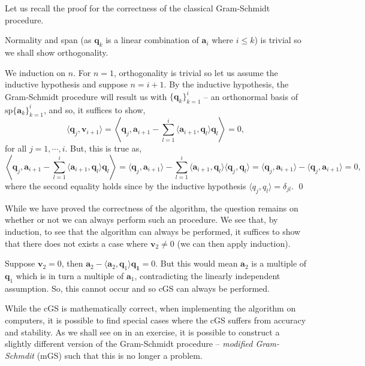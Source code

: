 \documentclass[
]{article}
\theoremstyle{definition}
\theoremstyle{definition}
\begin{document}
Let us recall the proof for the correctness of the classical
Gram-Schmidt procedure.

\proof

Normality and span (as \(\mathbf{q}_k\) is a linear combination of
\(\mathbf{a}_i\) where \(i \le k\)) is trivial so we shall show
orthogonality.

We induction on \(n\). For \(n = 1\), orthogonality is trivial so let us
assume the inductive hypothesis and suppose \(n = i + 1\). By the
inductive hypothesis, the Gram-Schmidt procedure will result us with
\(\{\mathbf{q}_k\}_{k = 1}^i\) -- an orthonormal basis of
\(\text{sp} \{\mathbf{a}_k\}_{k = 1}^i\), and so, it suffices to show,
\[\langle \mathbf{q}_j, \mathbf{v}_{i + 1} \rangle = 
    \left\langle \mathbf{q}_j, \mathbf{a}_{i + 1} - \sum_{l = 1}^{i} \langle \mathbf{a}_{i + 1}, 
      \mathbf{q}_l \rangle \mathbf{q}_l \right\rangle = 0,\] for all
\(j = 1, \cdots, i\). But, this is true as,
\[\left\langle \mathbf{q}_j, \mathbf{a}_{i + 1} - \sum_{l = 1}^{i} \langle \mathbf{a}_{i + 1}, 
      \mathbf{q}_l \rangle \mathbf{q}_l \right\rangle = 
      \langle \mathbf{q}_j, \mathbf{a}_{i + 1}\rangle - \sum_{l = 1}^{i} \langle \mathbf{a}_{i + 1}, 
      \mathbf{q}_l \rangle \langle \mathbf{q}_j, \mathbf{q}_l \rangle = 
      \langle \mathbf{q}_j, \mathbf{a}_{i + 1}\rangle - 
      \langle \mathbf{q}_j, \mathbf{a}_{i + 1}\rangle = 0,\] where the
second equality holds since by the inductive hypothesis
\(\langle q_j, q_l \rangle = \delta_{jl}\). \qed

While we have proved the correctness of the algorithm, the question
remains on whether or not we can always perform such an procedure. We
see that, by induction, to see that the algorithm can always be
performed, it suffices to show that there does not exists a case where
\(\mathbf{v}_2 \neq 0\) (we can then apply induction).

Suppose \(\mathbf{v}_2 = 0\), then
\(\mathbf{a}_2 -  \langle \mathbf{a}_2, \mathbf{q}_1 \rangle \mathbf{q_1} = 0\).
But this would mean \(\mathbf{a}_2\) is a multiple of \(\mathbf{q}_1\)
which is in turn a multiple of \(\mathbf{a}_1\), contradicting the
linearly independent assumption. So, this cannot occur and so cGS can
always be performed.

While the cGS is mathematically correct, when implementing the algorithm
on computers, it is possible to find special cases where the cGS suffers
from accuracy and stability. As we shall see on in an exercise, it is
possible to construct a slightly different version of the Gram-Schmidt
procedure -- \emph{modified Gram-Schmdit} (mGS) such that this is no
longer a problem.
\end{document}
